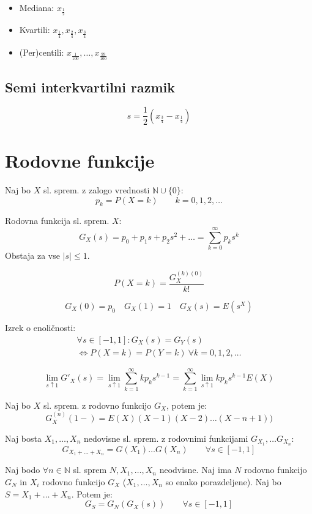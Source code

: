 \begin{multicols}{5}
\begin{itemize}
	\item Mediana: $x_{\frac{1}{2}}$
	\item Kvartili: $x_{\frac{1}{4}}, x_{\frac{2}{4}}, x_{\frac{3}{4}}$
	\item (Per)centili: $x_{\frac{1}{100}}, \dots, x_{\frac{99}{100}}$
\end{itemize}

\subsection{Semi interkvartilni razmik}
\[ s = \frac{1}{2}\left(x_{\frac{3}{4}} - x_{\frac{1}{4}} \right)\]

\section{Rodovne funkcije}
Naj bo $X$ sl. sprem. z zalogo vrednosti $\mathbb{N} \cup \{0\}$: 
\[ p_k = P(X=k) \qquad k = 0,1,2,\dots \]

Rodovna funkcija sl. sprem. $X$:
\[G_X(s) = p_0 + p_1 s + p_2 s^2 + \dots = \sum_{k=0}^\infty p_k s^k \]
Obstaja za vse $|s| \leq 1$.

\[ P(X=k) = \frac{G_X^{(k)(0)}}{k!} \]

\[ G_X(0) = p_0 \quad G_X(1) = 1 \quad G_X(s) = E(s^X) \]

Izrek o enoličnosti:
\begin{multline*}
\forall s \in [-1, 1]: G_X(s) = G_Y(s) \\
\iff P(X=k) = P(Y=k)\ \forall k = 0, 1, 2, \dots
\end{multline*}

\[ \lim_{s \uparrow 1} G'_X(s) = \lim_{s \uparrow 1} \sum_{k=1}^\infty k p_k s^{k-1} =  \sum_{k=1}^\infty  \lim_{s \uparrow 1} k p_k s^{k-1}  E(X)\]

Naj bo $X$ sl. sprem. z rodovno funkcijo $G_X$, potem je:
\[ G_X^{(n)}(1-) = E(X)(X-1)(X-2)\dots (X-n+1))\]

Naj bosta $X_1, \dots , X_n$ nedovisne sl. sprem. z rodovnimi funkcijami $G_{X_1}, \dots G_{X_n}$:
\[ G_{X_1+\dots + X_n} = G(X_1) \dots G(X_n) \qquad \forall s \in [-1, 1]\]


Naj bodo $\forall n \in \mathbb{N}$ sl. sprem $N, X_1, \dots, X_n$ neodvisne. Naj ima $N$ rodovno funkcijo $G_N$ in $X_i$ rodovno funkcijo $G_X$ ($X_1, \dots, X_n$ so enako porazdeljene).
Naj bo $S = X_1 +  \dots + X_n$. Potem je:
\[ G_S = G_N(G_X(s)) \qquad \forall s \in [-1, 1]\]


\end{multicols}
